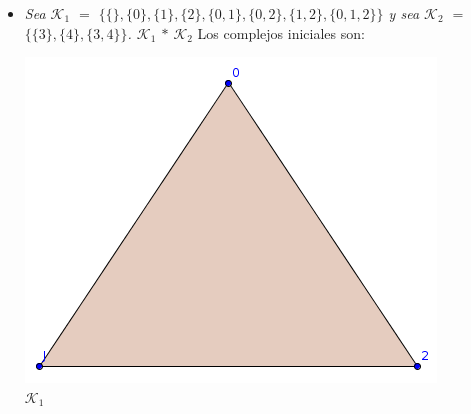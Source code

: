 \documentclass{article}
\begin{document}
\begin{enumerate}
{\begin{itemize}
    \item{
        \textsl{
          Sea $\mathcal{K}_1$ $=$
          $\{\{\},\{0\},\{1\},\{2\},\{0,1\},\{0,2\},\{1,2\},\{0,1,2\}\}$
          y sea $\mathcal{K}_2$ $=$ $\{\{3\}, \{4\}, \{3,
          4\}\}$. $\mathcal{K}_1$ $*$ $\mathcal{K}_2$
        }
        Los complejos iniciales son:
        \begin{center}
          \includegraphics[scale=0.4]{entrada3_4a.png}
          \\ $\mathcal{K}_1$
        \end{center}

}
\end{itemize}}
\end{enumerate}
\end{document}
